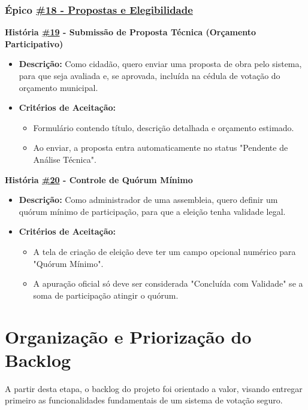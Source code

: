 \documentclass[12pt,a4paper]{article}
\begin{document}
\subsubsection*{Épico \href{https://github.com/gsscala/MC656/issues/18}{\#18 - Propostas e Elegibilidade}}
\textbf{História \href{https://github.com/gsscala/MC656/issues/19}{\#19} - Submissão de Proposta Técnica (Orçamento Participativo)}
\begin{itemize}
    \item \textbf{Descrição:} Como cidadão, quero enviar uma proposta de obra pelo sistema, para que seja avaliada e, se aprovada, incluída na cédula de votação do orçamento municipal.
    \item \textbf{Critérios de Aceitação:}
    \begin{itemize}
        \item Formulário contendo título, descrição detalhada e orçamento estimado.
        \item Ao enviar, a proposta entra automaticamente no status "Pendente de Análise Técnica".
    \end{itemize}
\end{itemize}

\textbf{História \href{https://github.com/gsscala/MC656/issues/20}{\#20} - Controle de Quórum Mínimo}
\begin{itemize}
    \item \textbf{Descrição:} Como administrador de uma assembleia, quero definir um quórum mínimo de participação, para que a eleição tenha validade legal.
    \item \textbf{Critérios de Aceitação:}
    \begin{itemize}
        \item A tela de criação de eleição deve ter um campo opcional numérico para "Quórum Mínimo".
        \item A apuração oficial só deve ser considerada "Concluída com Validade" se a soma de participação atingir o quórum.
    \end{itemize}
\end{itemize}


\section{Organização e Priorização do Backlog}

A partir desta etapa, o backlog do projeto foi orientado a valor, visando entregar primeiro as funcionalidades fundamentais de um sistema de votação seguro.
\end{document}
